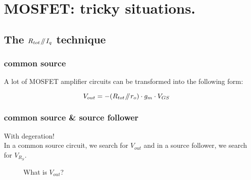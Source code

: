 \documentclass[11ypt]{extarticle}
\def \globalscale {1} %
\newcommand{\parallelEE}{\mathbin{\!/\mkern-5mu/\!}} %
\begin{document}
\section{MOSFET: tricky situations.}

\subsection{The $R_{tot} \parallelEE I_q$ technique}

\subsubsection{common source}
A lot of MOSFET amplifier circuits can be transformed into the following form:

\begin{figure}[H]{} 
    \centering
    
\end{figure}

\begin{equation}
    V_{out} = -(R_{tot} \parallelEE r_o)\cdot g_m \cdot V_{GS}
\end{equation}
\subsubsection{common source \& source follower}
With degeration!
\\
In a common source circuit, we search for $V_{out}$ and in a source follower, we search for $V_{R_S}$.
\def \localscale {\globalscale*0.8} %

\begin{figure}[H]{} 
    \centering
    
\caption{What is $V_{out}$?}

\end{figure}
\end{document}
